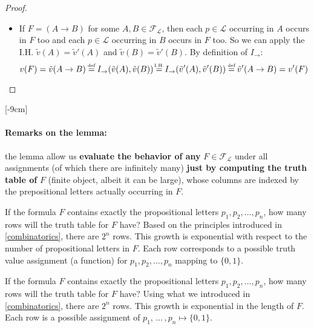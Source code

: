 \begin{proof}
\begin{itemize}
		\item If $F = (A \rightarrow B)$ for some $A, B \in \mathcal{F}_\mathcal{L}$, then each $p \in \mathcal{L}$ occurring in $A$ occurs in $F$ too and each $p \in \mathcal{L}$ occurring in $B$ occurs in $F$ too.
		So we can apply the I.H. $\tilde{v} (A) = \tilde{v}' (A)$ and $\tilde{v} (B) = \tilde{v}' (B)$. By definition of $I_\rightarrow$:
			  $$ v(F) = \tilde{v} (A \rightarrow B) \stackrel{\mathclap{\tiny\mbox{def}}}{=} I_\rightarrow (\tilde{v}(A), \tilde{v}(B)) \stackrel{\mathclap{\tiny\mbox{I.H.}}}{=}  I_\rightarrow (\tilde{v}' (A), \tilde{v}' (B)) \stackrel{\mathclap{\tiny\mbox{def}}}{=} \tilde{v}' (A \rightarrow B) = v'(F) $$
	  \end{itemize}
	\end{proof}

	[-9cm]
	\vspace{-0.5cm}

	\paragraph{Remarks on the lemma:} the lemma allow us \textbf{evaluate the behavior of any} $F \in \mathcal{F}_\mathcal{L}$ under all assignments (of which there are infinitely many) \textbf{just by computing the truth table of} $F$ (finite object, albeit it can be large), whose columns are indexed by the prepositional letters actually occurring in $F$.

	If the formula \( F \) contains exactly the propositional letters \( p_1, p_2, \ldots, p_n \), how many rows will the truth table for \( F \) have?
    Based on the principles introduced in \ref{combinatorics}, there are \( 2^n \) rows. This growth is exponential with respect to the number of propositional letters in \( F \). Each row corresponds to a possible truth value assignment (a function) for \( p_1, p_2, \ldots, p_n \) mapping to \(\{0,1\}\).

	If the formula \( F \) contains exactly the propositional letters \( p_1, p_2, \ldots, p_n \), how many rows will the truth table for \( F \) have?
	Using what we introduced in \ref{combinatorics}, there are $2^n$ rows. This growth is exponential in the length of $F$. Each row is a possible assignment of $p_1, \, ... \, , p_n \mapsto \{0,1\}$.\\

	\newpage

